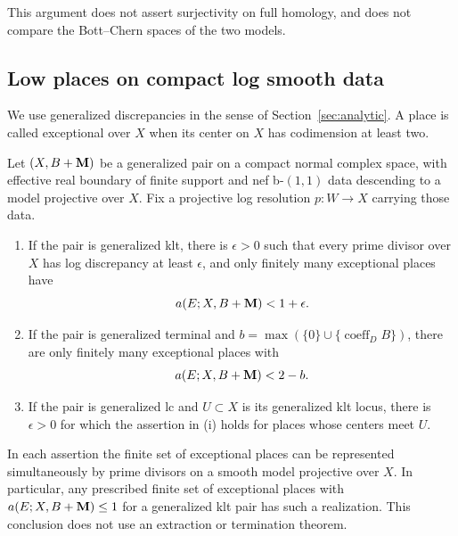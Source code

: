 This argument does not assert surjectivity on full homology, and does
not compare the Bott--Chern spaces of the two models.

\subsection{Low places on compact log smooth data}

We use generalized discrepancies in the sense of
Section~\ref{sec:analytic}.  A place is called exceptional over $X$ when
its center on $X$ has codimension at least two.

\begin{lemma}\label{lem:low-places}
Let $(X,B+\mathbf M)$ be a generalized pair on a compact normal complex
space, with effective real boundary of finite support and nef
b-$(1,1)$ data descending to a model projective over $X$.  Fix a projective log resolution $p:W\to X$ carrying those data.
\begin{enumerate}[label=\textup{(\roman*)}]
\item If the pair is generalized klt, there is $\epsilon>0$ such that
every prime divisor over $X$ has log discrepancy at least $\epsilon$,
and only finitely many exceptional places have
\[
 a(E;X,B+\mathbf M)<1+\epsilon.
\]
\item If the pair is generalized terminal and
$b=\max(\{0\}\cup\{\operatorname{coeff}_D B\})$, there are only
finitely many exceptional places with
\[
 a(E;X,B+\mathbf M)<2-b.
\]
\item If the pair is generalized lc and $U\subset X$ is its generalized
klt locus, there is $\epsilon>0$ for which the assertion in \textup{(i)}
holds for places whose centers meet $U$.
\end{enumerate}
In each assertion the finite set of exceptional places can be represented
simultaneously by prime divisors on a smooth model projective over $X$.
In particular, any prescribed finite set of exceptional places with
$a(E;X,B+\mathbf M)\leq 1$ for a generalized klt pair has such a realization.
This conclusion does not use an extraction or termination theorem.
\end{lemma}

